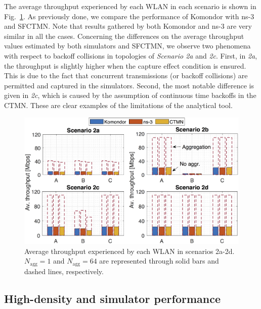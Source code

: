 \documentclass[conference]{IEEEtran}
\begin{document}
	The average throughput experienced by each WLAN in each scenario is shown in Fig.~\ref{fig:results_complex_scenarios}. As previously done, we compare the performance of Komondor with ns-3 and SFCTMN. Note that results gathered by both Komondor and ns-3 are very similar in all the cases. Concerning the differences on the average throughput values estimated by both simulators and SFCTMN, we observe two phenomena with respect to backoff collisions in topologies of \textit{Scenario 2a} and \textit{2c}. First, in \textit{2a}, the throughput is slightly higher when the capture effect condition is ensured. This is due to the fact that concurrent transmissions (or backoff collisions) are permitted and captured in the simulators. Second, the most notable difference is given in \textit{2c}, which is caused by the assumption of continuous time backoffs in the CTMN. These are clear examples of the limitations of the analytical tool.
	
	\begin{figure}[t]
		\centering	
		\includegraphics[width=1\columnwidth]{results_scenario_2.png}
		\caption{Average throughput experienced by each WLAN in scenarios 2a-2d. $N_{\text{agg}} = 1$ and $N_{\text{agg}}=64$ are represented through solid bars and dashed lines, respectively.}
		\label{fig:results_complex_scenarios}
	\end{figure}
	
	\subsection{High-density and simulator performance}
	
\end{document}
